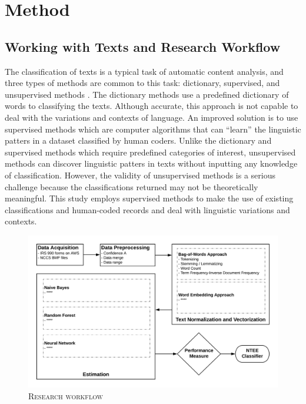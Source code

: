 \documentclass[12pt]{article}
\begin{document}


\section{Method}

\subsection{Working with Texts and Research Workflow}

The classification of texts is a typical task of automatic content analysis, and three types of methods are common to this task: dictionary, supervised, and unsupervised methods \parencite[268-269]{GrimmerTextDataPromise2013}. The dictionary methods use a predefined dictionary of words to classifying the texts. Although accurate, this approach is not capable to deal with the variations and contexts of language. An improved solution is to use supervised methods which are computer algorithms that can ``learn'' the linguistic patters in a dataset classified by human coders. Unlike the dictionary and supervised methods which require predefined categories of interest, unsupervised methods can discover linguistic patters in texts without inputting any knowledge of classification. However, the validity of unsupervised methods is a serious challenge because the classifications returned may not be theoretically meaningful. This study employs supervised methods to make the use of existing classifications and human-coded records and deal with linguistic variations and contexts. 

\begin{figure}
	\centering
	\caption{\textsc{Research workflow}} \label{fig:workflow}
	\includegraphics[width=1\textwidth]{paper/tbl_fig/NTEE-workflow.png}
\end{figure}
\end{document}
